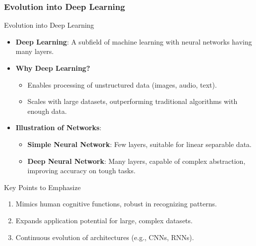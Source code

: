 \documentclass[aspectratio=169]{beamer}
\begin{document}
\begin{frame}[fragile]
    \frametitle{Evolution into Deep Learning}
    \begin{block}{Evolution into Deep Learning}
        \begin{itemize}
            \item \textbf{Deep Learning}: A subfield of machine learning with neural networks having many layers.
            \item \textbf{Why Deep Learning?}
                \begin{itemize}
                    \item Enables processing of unstructured data (images, audio, text).
                    \item Scales with large datasets, outperforming traditional algorithms with enough data.
                \end{itemize}
            \item \textbf{Illustration of Networks}:
                \begin{itemize}
                    \item \textbf{Simple Neural Network}: Few layers, suitable for linear separable data.
                    \item \textbf{Deep Neural Network}: Many layers, capable of complex abstraction, improving accuracy on tough tasks.
                \end{itemize}
        \end{itemize}
    \end{block}
    
    \begin{block}{Key Points to Emphasize}
        \begin{enumerate}
            \item Mimics human cognitive functions, robust in recognizing patterns.
            \item Expands application potential for large, complex datasets.
            \item Continuous evolution of architectures (e.g., CNNs, RNNs).
        \end{enumerate}
    \end{block}
\end{frame}
\end{document}
